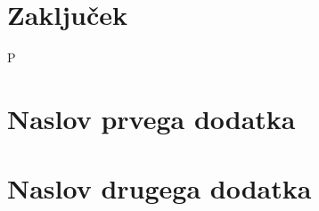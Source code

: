 \chapter{Zaključek}

P


\cleardoublepage{}
{}




\cleardoublepage
\renewcommand\appendixname{Dodatek}
\begin{appendices}

\chapter{Naslov prvega dodatka}
    

\chapter{Naslov drugega dodatka}

\end{appendices}


\cleardoublepage
\printindex

